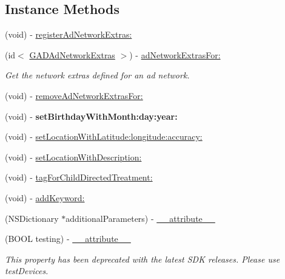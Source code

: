 \subsection*{Instance Methods}
\begin{DoxyCompactItemize}
\item 
(void) -\/ \hyperlink{interfaceGADRequest_acaa89d7cc5abf9313c039bc91bf09359}{register\+Ad\+Network\+Extras\+:}
\item 
\mbox{\label{interfaceGADRequest_a5a5d9308c5e9dad996beb30de17ff921}} 
(id$<$ \hyperlink{protocolGADAdNetworkExtras-p}{G\+A\+D\+Ad\+Network\+Extras} $>$) -\/ \hyperlink{interfaceGADRequest_a5a5d9308c5e9dad996beb30de17ff921}{ad\+Network\+Extras\+For\+:}
\begin{DoxyCompactList}\small\item\em Get the network extras defined for an ad network. \end{DoxyCompactList}\item 
(void) -\/ \hyperlink{interfaceGADRequest_aa22171cb82d2fedd19cbdd84aae4d653}{remove\+Ad\+Network\+Extras\+For\+:}
\item 
\mbox{\label{interfaceGADRequest_a6413f3d5664305d299779f5b8efe1f90}} 
(void) -\/ {\bfseries set\+Birthday\+With\+Month\+:day\+:year\+:}
\item 
(void) -\/ \hyperlink{interfaceGADRequest_ad20cf8f7fabbbe2030e1f8277e5598f8}{set\+Location\+With\+Latitude\+:longitude\+:accuracy\+:}
\item 
(void) -\/ \hyperlink{interfaceGADRequest_a80b906a01ff334f984f7ec6f70a2d10a}{set\+Location\+With\+Description\+:}
\item 
(void) -\/ \hyperlink{interfaceGADRequest_aac5fa7bc678b1867b8815ca13f5b69a7}{tag\+For\+Child\+Directed\+Treatment\+:}
\item 
(void) -\/ \hyperlink{interfaceGADRequest_abc6e22f79dfc076fdb9bb00ca5d47c3a}{add\+Keyword\+:}
\item 
(N\+S\+Dictionary $\ast$additional\+Parameters) -\/ \hyperlink{interfaceGADRequest_a9005c9237b61a20c67a29516c1781985}{\+\_\+\+\_\+attribute\+\_\+\+\_\+}
\item 
\mbox{\label{interfaceGADRequest_a3cdec7968476757c9281da706ffbdd8d}} 
(B\+O\+OL testing) -\/ \hyperlink{interfaceGADRequest_a3cdec7968476757c9281da706ffbdd8d}{\+\_\+\+\_\+attribute\+\_\+\+\_\+}
\begin{DoxyCompactList}\small\item\em This property has been deprecated with the latest S\+DK releases. Please use test\+Devices. \end{DoxyCompactList}\end{DoxyCompactItemize}
